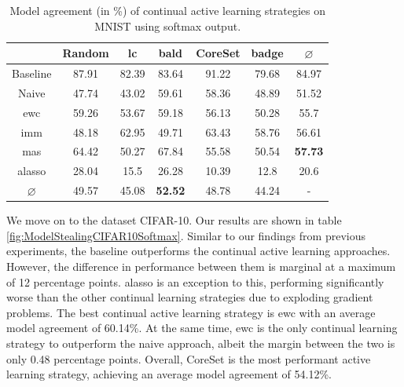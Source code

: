 \begin{table}[h]
    \centering
    \begin{tabular}{ c | c c c c c | c } 
         & Random & \gls{lc} & \gls{bald} & CoreSet & \gls{badge} & $\varnothing$\\ 
        \hline
        Baseline & 87.91 & 82.39 & 83.64 & 91.22 & 79.68 & 84.97\\
        \hline
        Naive & 47.74 & 43.02 & 59.61 & 58.36 & 48.89 & 51.52\\
        \gls{ewc} &  59.26 & 53.67 & 59.18 & 56.13 & 50.28 & 55.7\\
        \gls{imm} & 48.18 & 62.95 & 49.71 & 63.43 & 58.76 & 56.61 \\
        \gls{mas} &  64.42 & 50.27 & 67.84 & 55.58 & 50.54 & \textbf{57.73}\\
        \gls{alasso} & 28.04 & 15.5 & 26.28 & 10.39 & 12.8 & 20.6\\
        \hline
        $\varnothing$ & 49.57 & 45.08 & \textbf{52.52} & 48.78 & 44.24 & -\\
    \end{tabular}
    \caption{Model agreement (in \%) of continual active learning strategies on MNIST using softmax output.}
    \label{fig:ModelStealingMNISTSoftmax}
\end{table}


We move on to the dataset CIFAR-10. Our results are shown in table \ref{fig:ModelStealingCIFAR10Softmax}. Similar to our findings from previous experiments, the baseline outperforms 
the continual active learning approaches. However, the difference in performance between them is marginal at a maximum of 12 percentage points.
\gls{alasso} is an exception to this, performing significantly worse than the other continual learning strategies due to exploding gradient problems. The best continual active
learning strategy is \gls{ewc} with an average model agreement of 60.14\%. At the same time, \gls{ewc} is the only continual learning strategy to outperform the naive approach,
albeit the margin between the two is only 0.48 percentage points. Overall, CoreSet is the most performant active learning strategy, achieving an average model agreement of 54.12\%. \par

